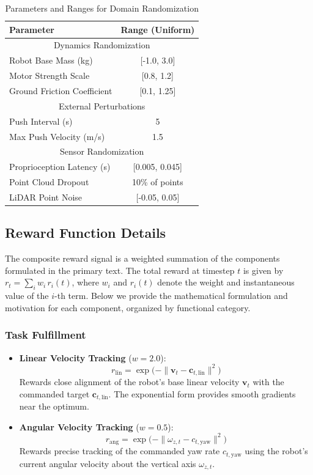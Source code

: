 \begin{table}[h!]
\centering
\caption{Parameters and Ranges for Domain Randomization}
\label{tab:dr_params}
\begin{tabular}{lc}
\toprule
\textbf{Parameter} & \textbf{Range (Uniform)} \\
\midrule
\multicolumn{2}{c}{Dynamics Randomization} \\
Robot Base Mass (kg) & [-1.0, 3.0] \\
Motor Strength Scale & [0.8, 1.2] \\
Ground Friction Coefficient & [0.1, 1.25] \\
\midrule
\multicolumn{2}{c}{External Perturbations} \\
Push Interval (s) & 5 \\
Max Push Velocity (m/s) & 1.5 \\
\midrule
\multicolumn{2}{c}{Sensor Randomization} \\
Proprioception Latency (s) & [0.005, 0.045] \\
Point Cloud Dropout & 10\% of points \\
LiDAR Point Noise & [-0.05, 0.05] \\
\bottomrule
\end{tabular}
\end{table}

\subsection{Reward Function Details}
The composite reward signal is a weighted summation of the components formulated in the primary text. The total reward at timestep $t$ is given by $r_t = \sum_i w_i \, r_i(t)$, where $w_i$ and $r_i(t)$ denote the weight and instantaneous value of the $i$-th term. Below we provide the mathematical formulation and motivation for each component, organized by functional category.

\subsubsection*{Task Fulfillment}
\begin{itemize}
    \item \textbf{Linear Velocity Tracking} ($w = 2.0$):
    \begin{equation}
        r_{\text{lin}} = \exp\!\big(-\|\mathbf{v}_{t} - \mathbf{c}_{t,\text{lin}}\|^2\big)
    \end{equation}
    Rewards close alignment of the robot's base linear velocity $\mathbf{v}_t$ with the commanded target $\mathbf{c}_{t,\text{lin}}$. The exponential form provides smooth gradients near the optimum.
    \item \textbf{Angular Velocity Tracking} ($w = 0.5$):
    \begin{equation}
        r_{\text{ang}} = \exp\!\big(-\|\omega_{z,t} - c_{t,\text{yaw}}\|^2\big)
    \end{equation}
    Rewards precise tracking of the commanded yaw rate $c_{t,\text{yaw}}$ using the robot's current angular velocity about the vertical axis $\omega_{z,t}$.
\end{itemize}

